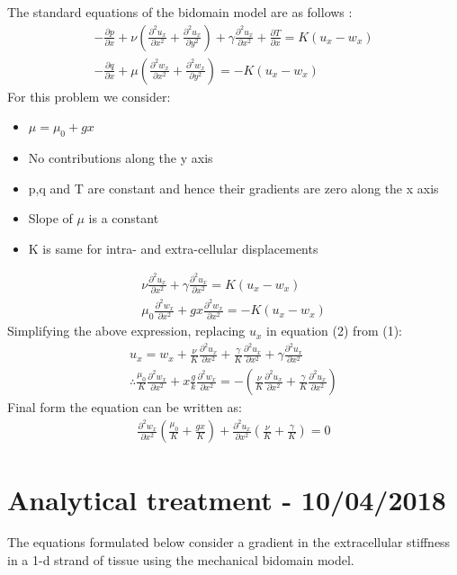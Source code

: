 \documentclass[a4paper,oneside,11pt]{report}
\begin{document}
The standard equations of the bidomain model are as follows \cite{roth2012}: 
\begin{align}
-\frac{\partial p}{\partial x} + \nu(\frac{\partial^{2}u_x}{\partial x^2} + \frac{\partial^{2}u_x}{\partial y^2} ) + \gamma\frac{\partial^{2}u_x}{\partial x^2} + \frac{\partial T}{\partial x} = K(u_x - w_x) \\
-\frac{\partial q}{\partial x} + \mu(\frac{\partial^{2}w_x}{\partial x^2} + \frac{\partial^{2}w_x}{\partial y^2} ) = -K(u_x - w_x) 
\end{align}   
For this problem we consider:
\begin{itemize} 
\item $\mu = \mu_0 + gx$ 
\item No contributions along the y axis
\item p,q and T are constant and hence their gradients are zero along the x axis
\item Slope of $\mu$ is a constant 
\item K is same for intra- and extra-cellular displacements
\end{itemize}
\begin{align}
    \nu\frac{\partial^{2}u_x}{\partial x^2} + \gamma\frac{\partial^{2}u_x}{\partial x^2} = K(u_x - w_x)  \\
    \mu_0\frac{\partial^{2}w_x}{\partial x^2} + gx\frac{\partial^{2}w_x}{\partial x^2} = -K(u_x - w_x) 
\end{align}
Simplifying the above expression, replacing $u_x$ in equation (2) from (1): 
\begin{align}
   u_x = w_x + \frac{\nu}{K}\frac{\partial^{2}u_x}{\partial x^2} + \frac{\gamma}{K}\frac{\partial^{2}u_x}{\partial x^2} + \gamma\frac{\partial^{2}u_x}{\partial x^2} \\
   \therefore \frac{\mu_0}{K}\frac{\partial^{2}w_x}{\partial x^2} + x\frac{g}{k}\frac{\partial^{2}w_x}{\partial x^2} = - ( \frac{\nu}{K}\frac{\partial^{2}u_x}{\partial x^2} + \frac{\gamma}{K}\frac{\partial^{2}u_x}{\partial x^2} )
\end{align}
Final form the equation can be written as: 
\begin{align}
\frac{\partial^{2}w_x}{\partial x^2} (\frac{\mu_0}{K} + \frac{gx}{K}) + \frac{\partial^{2}u_x}{\partial x^2} (\frac{\nu}{K} + \frac{\gamma}{K} ) = 0
\end{align}
\clearpage
\section*{Analytical treatment - 10/04/2018}
The equations formulated below consider a gradient in the extracellular stiffness in a 1-d strand of tissue using the mechanical bidomain model. \\
\end{document}
